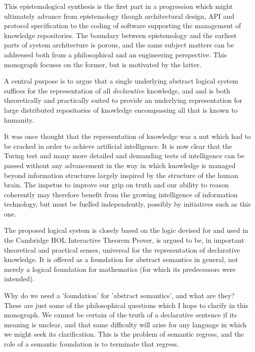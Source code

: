 This epistemological synthesis is the first part in a progression which might ultimately advance from epistemology though architectural design, API and protocol specification to the coding of software supporting the management of knowledge repositories.
The boundary between epistemology and the earliest parts of system architecture is porous, and the same subject matters can be addressed both from a philosophical and an engineering perspective.
This monograph focuses on the former, but is motivated by the latter.

A central purpose is to argue that a single underlying abstract logical system suffices for the representation of all \emph{declarative} knowledge, and and is both theoretically and practically suited to provide an underlying representation for large distributed repositories of knowledge encompassing all that is known to humanity.

It was once thought that the representation of knowledge was a nut which had to be cracked in order to achieve artificial intelligence.
It is now clear that the Turing test and many more detailed and demanding tests of intelligence can be passed without any advancement in the way in which knowledge is managed beyond information structures largely inspired by the structure of the human brain.
The impetus to improve our grip on truth and our ability to reason coherently may therefore benefit from the growing intelligence of information technology, but must be fuelled independently, possibly by initiatives such as this one.

The proposed logical system is closely based on the logic devised for and used in the Cambridge HOL Interactive Theorem Prover\cite{gordon1993}, is argued to be, in important theoretical and practical senses, universal for the representation of declarative knowledge.
It is offered as a foundation for abstract semantics in general, not merely a logical foundation for mathematics (for which its predecessors were intended).

Why do we need a 'foundation' for 'abstract semantics', and what are they?
These are just some of the philosophical questions which I hope to clarify in this monograph.
We cannot be certain of the truth of a declarative sentence if its meaning is unclear, and that same difficulty will arise for any language in which we might seek its clarification.
This is the problem of semantic regress, and the role of a semantic foundation is to terminate that regress.

\vbox{\ }

